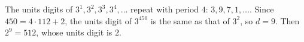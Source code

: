 The units digits of $3^1,3^2,3^3,3^4,\dots$ repeat with period $4$: $3,9,7,1,\dots$. Since $450=4\cdot112+2$, the units digit of $3^{450}$ is the same as that of $3^2$, so $d=9$. Then $2^9=512$, whose units digit is $\boxed{2}$.
